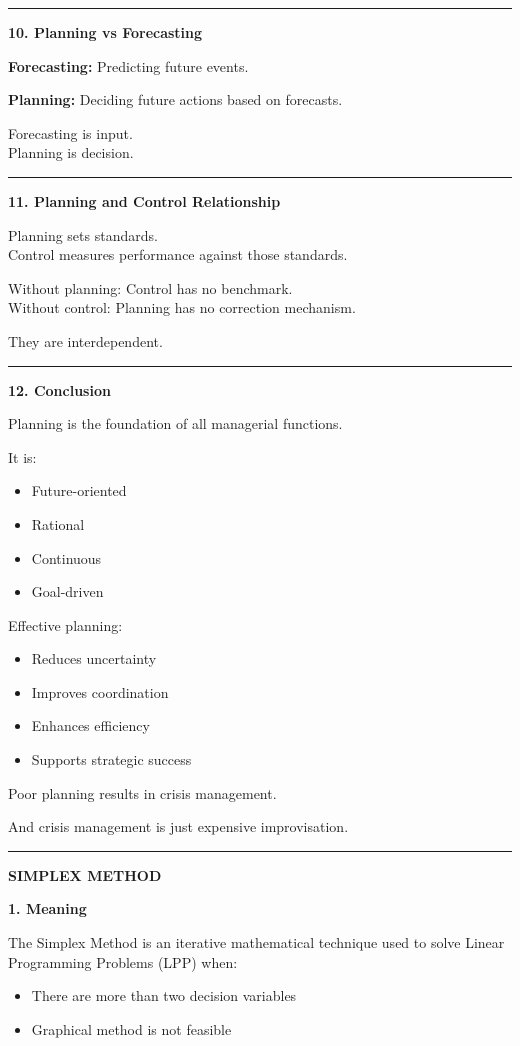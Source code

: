 \documentclass[10pt,a4paper]{article}
\newcommand{\separator}{\vspace{0.4em}\noindent\rule{\linewidth}{0.6pt}\vspace{0.4em}}
\begin{document}
\separator

\textbf{10. Planning vs Forecasting}

\textbf{Forecasting:} Predicting future events.

\textbf{Planning:} Deciding future actions based on forecasts.

Forecasting is input.\\
Planning is decision.

\separator

\textbf{11. Planning and Control Relationship}

Planning sets standards.\\
Control measures performance against those standards.

Without planning: Control has no benchmark.\\
Without control: Planning has no correction mechanism.

They are interdependent.

\separator

\textbf{12. Conclusion}

Planning is the foundation of all managerial functions.

It is:
\begin{itemize}
  \item Future-oriented
  \item Rational
  \item Continuous
  \item Goal-driven
\end{itemize}

Effective planning:
\begin{itemize}
  \item Reduces uncertainty
  \item Improves coordination
  \item Enhances efficiency
  \item Supports strategic success
\end{itemize}

Poor planning results in crisis management.

And crisis management is just expensive improvisation.

\separator

\begin{center}
  \large\textbf{SIMPLEX METHOD}
\end{center}

\textbf{1. Meaning}

The Simplex Method is an iterative mathematical technique used to solve Linear
Programming Problems (LPP) when:
\begin{itemize}
  \item There are more than two decision variables
  \item Graphical method is not feasible
\end{itemize}
\end{document}
